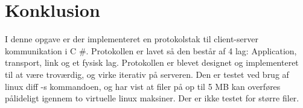 \chapter{Konklusion}\label{ch:konclusion}
I denne opgave er der implementeret en protokolstak til client-server kommunikation i C \#. Protokollen er lavet så den består af 4 lag: Application, transport, link og et fysisk lag. Protokollen er blevet designet og implementeret til at være troværdig, og virke iterativ på serveren. Den er testet ved brug af linux diff -s kommandoen, og har vist at filer på op til 5 MB kan overføres pålideligt igennem to virtuelle linux maksiner. Der er ikke testet for større filer.